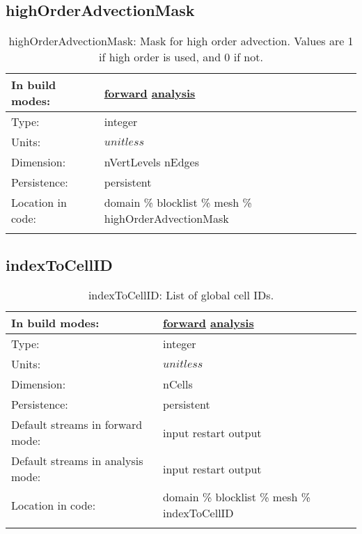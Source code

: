 \subsection[highOrderAdvectionMask]{highOrderAdvectionMask}
\label{subsec:var_sec_mesh_highOrderAdvectionMask}
\begin{center}
\begin{longtable}{| p{2.0in} | p{4.0in} |}
        \hline 
        In build modes: & \hyperref[subsec:forward_var_tab_mesh]{forward} \hyperref[subsec:analysis_var_tab_mesh]{analysis} \\
        \hline 
        Type: & integer \\
        \hline 
        Units: & $unitless$ \\
        \hline 
        Dimension: & nVertLevels nEdges \\
        \hline 
        Persistence: & persistent \\
        \hline 
		 Location in code: & domain \% blocklist \% mesh \% highOrderAdvectionMask \\
		 \hline 
    \caption{highOrderAdvectionMask: Mask for high order advection. Values are 1 if high order is used, and 0 if not.}
\end{longtable}
\end{center}
\subsection[indexToCellID]{indexToCellID}
\label{subsec:var_sec_mesh_indexToCellID}
\begin{center}
\begin{longtable}{| p{2.0in} | p{4.0in} |}
        \hline 
        In build modes: & \hyperref[subsec:forward_var_tab_mesh]{forward} \hyperref[subsec:analysis_var_tab_mesh]{analysis} \\
        \hline 
        Type: & integer \\
        \hline 
        Units: & $unitless$ \\
        \hline 
        Dimension: & nCells \\
        \hline 
        Persistence: & persistent \\
        \hline 
		 Default streams in forward mode: &  input restart output \\
        \hline 
		 Default streams in analysis mode: &  input restart output \\
        \hline 
		 Location in code: & domain \% blocklist \% mesh \% indexToCellID \\
		 \hline 
    \caption{indexToCellID: List of global cell IDs.}
\end{longtable}
\end{center}
